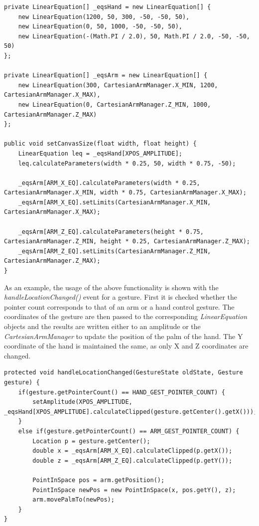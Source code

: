 \begin{lstlisting}[caption={Initizlization of LinearEquations for hand and arm}, label=lst:impl:abs:init]
private LinearEquation[] _eqsHand = new LinearEquation[] {
	new LinearEquation(1200, 50, 300, -50, -50, 50),
	new LinearEquation(0, 50, 1000, -50, -50, 50),
	new LinearEquation(-(Math.PI / 2.0), 50, Math.PI / 2.0, -50, -50, 50)
};

private LinearEquation[] _eqsArm = new LinearEquation[] {
	new LinearEquation(300, CartesianArmManager.X_MIN, 1200, CartesianArmManager.X_MAX),
	new LinearEquation(0, CartesianArmManager.Z_MIN, 1000, CartesianArmManager.Z_MAX)
};

public void setCanvasSize(float width, float height) {
	LinearEquation leq = _eqsHand[XPOS_AMPLITUDE];
	leq.calculateParameters(width * 0.25, 50, width * 0.75, -50);
	
	_eqsArm[ARM_X_EQ].calculateParameters(width * 0.25, CartesianArmManager.X_MIN, width * 0.75, CartesianArmManager.X_MAX);
	_eqsArm[ARM_X_EQ].setLimits(CartesianArmManager.X_MIN, CartesianArmManager.X_MAX);
	
	_eqsArm[ARM_Z_EQ].calculateParameters(height * 0.75, CartesianArmManager.Z_MIN, height * 0.25, CartesianArmManager.Z_MAX);
	_eqsArm[ARM_Z_EQ].setLimits(CartesianArmManager.Z_MIN, CartesianArmManager.Z_MAX);
}
\end{lstlisting}

As an example, the usage of the above functionality is shown with the \textit{handleLocationChanged()} event for a gesture. First it is checked whether the pointer count corresponds to that of an arm or a hand control gesture. The coordinates of the gesture are then passed to the corresponding \textit{LinearEquation} objects and the results are written either to an amplitude or the \textit{CartesianArmManager} to update the position of the palm of the hand. The Y coordinate of the hand is maintained the same, as only X and Z coordinates are changed.

\begin{lstlisting}[caption={Example usage of LinearEquation}]
protected void handleLocationChanged(GestureState oldState, Gesture gesture) {
	if(gesture.getPointerCount() == HAND_GEST_POINTER_COUNT) {
		setAmplitude(XPOS_AMPLITUDE, _eqsHand[XPOS_AMPLITUDE].calculateClipped(gesture.getCenter().getX()));
	}
	else if(gesture.getPointerCount() == ARM_GEST_POINTER_COUNT) {
		Location p = gesture.getCenter();
		double x = _eqsArm[ARM_X_EQ].calculateClipped(p.getX());
		double z = _eqsArm[ARM_Z_EQ].calculateClipped(p.getY());
		
		PointInSpace pos = arm.getPosition();
		PointInSpace newPos = new PointInSpace(x, pos.getY(), z);
		arm.movePalmTo(newPos);
	}
}
\end{lstlisting}

